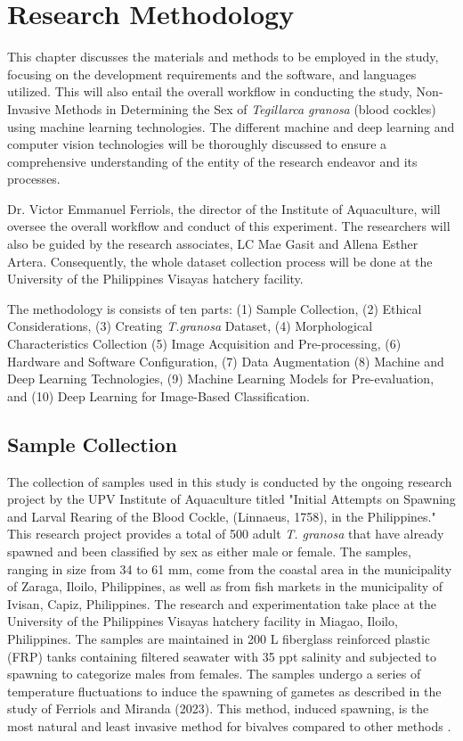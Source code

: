 \chapter{Research Methodology}
\label{sec:methodology}

This chapter discusses the materials and methods to be employed in the study, focusing on the development requirements and the software, and languages utilized. This will also entail the overall workflow in conducting the study, Non-Invasive Methods in Determining the Sex of \textit{Tegillarca granosa} (blood cockles) using machine learning technologies. The different machine and deep learning and computer vision technologies will be thoroughly discussed to ensure a comprehensive understanding of the entity of the research endeavor and its processes. 

Dr. Victor Emmanuel Ferriols, the director of the Institute of Aquaculture, will oversee the overall workflow and conduct of this experiment. The researchers will also be guided by the research associates, LC Mae Gasit and Allena Esther Artera. Consequently, the whole dataset collection process will be done at the University of the Philippines Visayas hatchery facility. 

The methodology is consists of ten parts: (1) Sample Collection, (2) Ethical Considerations, (3) Creating \textit{T.granosa} Dataset, (4) Morphological Characteristics Collection (5) Image Acquisition and Pre-processing, (6) Hardware and Software Configuration, (7) Data Augmentation (8) Machine and Deep Learning Technologies, (9) Machine Learning Models for Pre-evaluation, and (10) Deep Learning for Image-Based Classification. 

\section{Sample Collection}
\label{sec:samplecollect}
The collection of \Tgranosa samples used in this study is conducted by the ongoing research project by the UPV Institute of Aquaculture titled "Initial Attempts on Spawning and Larval Rearing of the Blood Cockle, \Tegillarcagranosa (Linnaeus, 1758), in the Philippines." This research project provides a total of 500 adult \textit{T. granosa} that have already spawned and been classified by sex as either male or female. The samples, ranging in size from 34 to 61 mm, come from the coastal area in the municipality of Zaraga, Iloilo, Philippines, as well as from fish markets in the municipality of Ivisan, Capiz, Philippines. The research and experimentation take place at the University of the Philippines Visayas hatchery facility in Miagao, Iloilo, Philippines. The samples are maintained in 200 L fiberglass reinforced plastic (FRP) tanks containing filtered seawater with 35 ppt salinity \cite{miranda2023} and subjected to spawning to categorize males from females. The samples undergo a series of temperature fluctuations to induce the spawning of gametes as described in the study of Ferriols and Miranda (2023). This method, induced spawning, is the most natural and least invasive method for bivalves compared to other methods \cite{aji}.

